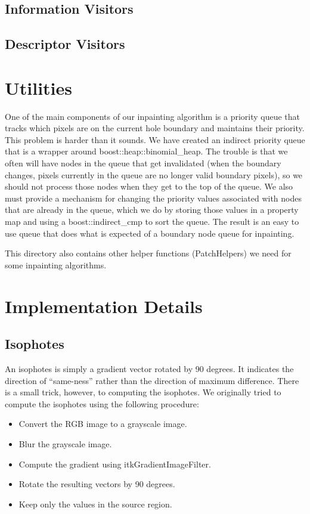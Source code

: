 \documentclass{InsightArticle}
\begin{document}
\subsection{Information Visitors}
\subsection{Descriptor Visitors}

\section{Utilities}
One of the main components of our inpainting algorithm is a priority queue that tracks which pixels are on the current hole boundary and maintains their priority. This problem is harder than it sounds. We have created an indirect priority queue that is a wrapper around boost::heap::binomial_heap. The trouble is that we often will have nodes in the queue that get invalidated (when the boundary changes, pixels currently in the queue are no longer valid boundary pixels), so we should not process those nodes when they get to the top of the queue. We also must provide a mechanism for changing the priority values associated with nodes that are already in the queue, which we do by storing those values in a property map and using a boost::indirect_cmp to sort the queue. The result is an easy to use queue that does what is expected of a boundary node queue for inpainting.

This directory also contains other helper functions (PatchHelpers) we need for some inpainting algorithms.
\section{Implementation Details}
\label{sec:ImplementationDetails}

\subsection{Isophotes}
An isophotes is simply a gradient vector rotated by 90 degrees. It indicates the direction of ``same-ness'' rather than the direction of maximum difference. There is a small trick, however, to computing the isophotes. We originally tried to compute the isophotes using the following procedure:

\begin{itemize}
 \item Convert the RGB image to a grayscale image.
 \item Blur the grayscale image.
 \item Compute the gradient using itkGradientImageFilter.
 \item Rotate the resulting vectors by 90 degrees.
 \item Keep only the values in the source region.
\end{itemize}
\end{document}
